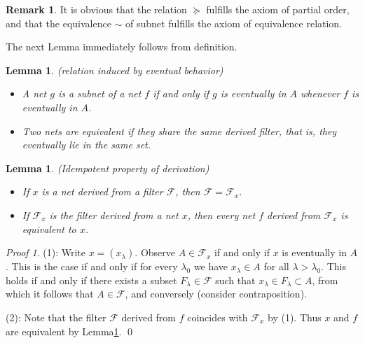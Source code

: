 \documentclass[a4paper,12pt]{article}
\newtheorem{lem}[thm]{Lemma}
\theoremstyle{remark}
\newtheorem*{prf}{Proof}
\theoremstyle{definition}
\newtheorem{rem}[thm]{Remark}
\theoremstyle{definition}
\theoremstyle{definition}
\begin{document}
\begin{rem}
	It is obvious that the relation \( \succeq \) fulfills the axiom of partial order, and that the equivalence \( \sim \) of subnet fulfills the axiom of equivalence relation.
\end{rem}

The next Lemma immediately follows from definition.
\begin{lem}\label{classification by eventual} (relation induced by eventual behavior)
	\begin{itemize}
		\item A net \( g \) is a subnet of a net \( f \) if and only if \( g \) is eventually in \( A \) whenever \( f \) is eventually in \( A \).
		\item Two nets are equivalent if they share the same derived filter, that is, they eventually lie in the same set.
	\end{itemize}
\end{lem}

\begin{lem}\label{reflexive property} (Idempotent property of derivation)
	\begin{itemize}
		\item[(1)] If \( x \) is a net derived from a filter \( \mathscr{F} \), then \( \mathscr{F} = \mathscr{F}_x \).
		\item[(2)] If \( \mathscr{F}_x \) is the filter derived from a net \( x \),
		      then every net \( f \) derived from \( \mathscr{F}_x \) is equivalent to \( x \).
	\end{itemize}
\end{lem}
\begin{prf}
	(1): Write \( x = (x_{\lambda}) \). Observe \( A \in \mathscr{F}_x \) if and only if \( x \) is eventually in \( A \).
	This is the case if and only if for every \( \lambda_0 \) we have \( x_{\lambda} \in A \) for all \( \lambda > \lambda_0 \).
	This holds if and only if there exists a subset \( F_{\lambda}\in \mathscr{F} \) such that \( x_{\lambda} \in F_{\lambda} \subset A \), from which it follows that \( A \in \mathscr{F} \), and conversely (consider contraposition).

	(2): Note that the filter \( \mathscr{F} \) derived from \( f \) coincides with \( \mathscr{F}_x \) by (1). Thus \( x \) and \( f \) are equivalent by Lemma\ref{classification by eventual}.
	\qed\end{prf}
\end{document}
